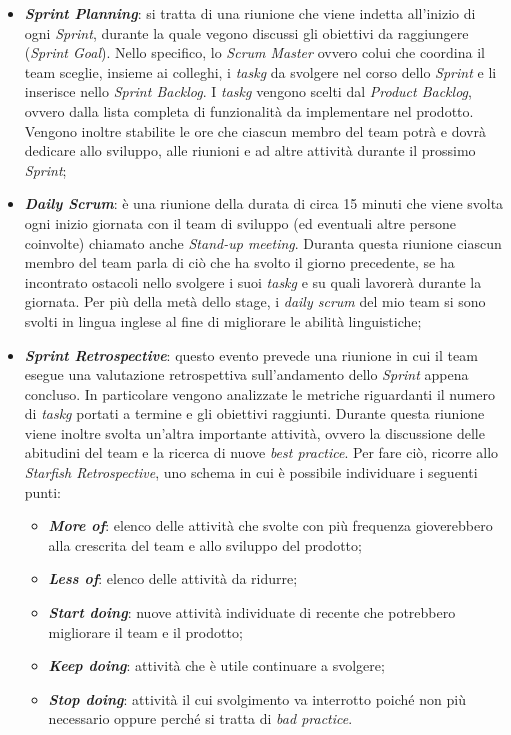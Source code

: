     \begin{itemize}
        \item \textit{\textbf{Sprint Planning}}: si tratta di una riunione che viene indetta all'inizio di ogni \textit{Sprint}, durante la quale vegono discussi gli obiettivi da raggiungere (\textit{Sprint Goal}). Nello specifico, lo \textit{Scrum Master} ovvero colui che coordina il team sceglie, insieme ai colleghi, i \textit{\gls{taskg}} da svolgere nel corso dello \textit{Sprint} e li inserisce nello \textit{Sprint Backlog}. I \textit{\gls{taskg}} vengono scelti dal \textit{Product Backlog}, ovvero dalla lista completa di funzionalità da implementare nel prodotto. Vengono inoltre stabilite le ore che ciascun membro del team potrà e dovrà dedicare allo sviluppo, alle riunioni e ad altre attività durante il prossimo \textit{Sprint};
        \item \textit{\textbf{Daily Scrum}}: è una riunione della durata di circa 15 minuti che viene svolta ogni inizio giornata con il team di sviluppo (ed eventuali altre persone coinvolte) chiamato anche \textit{Stand-up meeting}. Duranta questa riunione ciascun membro del team parla di ciò che ha svolto il giorno precedente, se ha incontrato ostacoli nello svolgere i suoi \textit{\gls{taskg}} e su quali lavorerà durante la giornata. Per più della metà dello stage, i \textit{daily scrum} del mio team si sono svolti in lingua inglese al fine di migliorare le abilità linguistiche;
        \item \textit{\textbf{Sprint Retrospective}}: questo evento prevede una riunione in cui il team esegue una valutazione retrospettiva sull'andamento dello \textit{Sprint} appena concluso. In particolare vengono analizzate le metriche riguardanti il numero di \textit{\gls{taskg}} portati a termine e gli obiettivi raggiunti. Durante questa riunione viene inoltre svolta un'altra importante attività, ovvero la discussione delle abitudini del team e la ricerca di nuove \textit{best practice}. Per fare ciò, ricorre allo \textit{Starfish Retrospective}, uno schema in cui è possibile individuare i seguenti punti:
            \begin{itemize}
                \item \textit{\textbf{More of}}: elenco delle attività che svolte con più frequenza gioverebbero alla crescrita del team e allo sviluppo del prodotto;
                \item \textit{\textbf{Less of}}: elenco delle attività da ridurre;
                \item \textit{\textbf{Start doing}}: nuove attività individuate di recente che potrebbero migliorare il team e il prodotto;
                \item \textit{\textbf{Keep doing}}: attività che è utile continuare a svolgere;
                \item \textit{\textbf{Stop doing}}: attività il cui svolgimento va interrotto poiché non più necessario oppure perché si tratta di \textit{bad practice}.
            \end{itemize}
            

\end{itemize}
